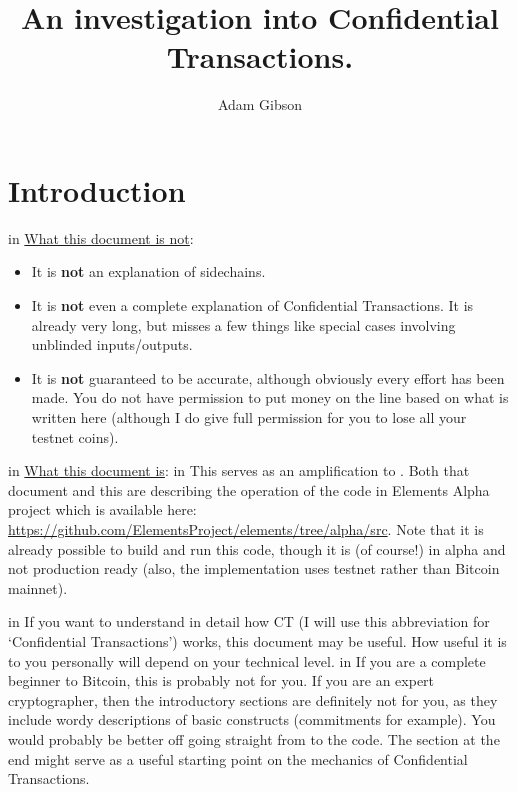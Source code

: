 \documentclass[10pt,a4paper]{article}
\author{Adam Gibson}
\begin{document}
\title{An investigation into Confidential Transactions.}
\maketitle

\section{Introduction}

 in \noindent \underline{What this document is not}:
\begin{itemize}
\item It is \textbf{not} an explanation of sidechains.
\item It is \textbf{not} even a complete explanation of Confidential Transactions. It is already very long, but misses a few things like special cases involving unblinded inputs/outputs.
\item It is \textbf{not} guaranteed to be accurate, although obviously every effort has been made. You do not have permission to put money on the line based on what is written here (although I do give full permission for you to lose all your testnet coins).
\end{itemize}

 in \noindent \underline{What this document is}:
 in \noindent This serves as an amplification to \cite{ct_wu}. Both that document and this are describing the operation of the code in Elements Alpha project which is available here: \url{https://github.com/ElementsProject/elements/tree/alpha/src}. Note that it is already possible to build and run this code, though it is (of course!) in alpha and not production ready (also, the implementation uses testnet rather than Bitcoin mainnet).

 in \noindent If you want to understand in detail how CT (I will use this abbreviation for `Confidential Transactions') works, this document may be useful. How useful it is to you personally will depend on your technical level.
 in \noindent If you are a complete beginner to Bitcoin, this is probably not for you. If you are an expert cryptographer, then the introductory sections are definitely not for you, as they include wordy descriptions of basic constructs (commitments for example). You would probably be better off going straight from \cite{ct_wu} to the code. The section at the end might serve as a useful starting point on the mechanics of Confidential Transactions.
\end{document}
